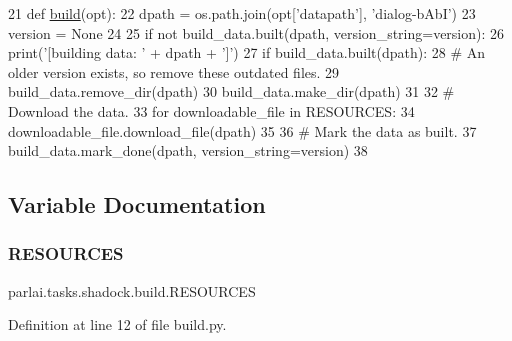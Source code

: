 \begin{DoxyCode}
21 \textcolor{keyword}{def }\hyperlink{namespacedialog__babi__feedback_1_1build_a7a9d289f7493a5ded13c4b7f071b6184}{build}(opt):
22     dpath = os.path.join(opt[\textcolor{stringliteral}{'datapath'}], \textcolor{stringliteral}{'dialog-bAbI'})
23     version = \textcolor{keywordtype}{None}
24 
25     \textcolor{keywordflow}{if} \textcolor{keywordflow}{not} build\_data.built(dpath, version\_string=version):
26         print(\textcolor{stringliteral}{'[building data: '} + dpath + \textcolor{stringliteral}{']'})
27         \textcolor{keywordflow}{if} build\_data.built(dpath):
28             \textcolor{comment}{# An older version exists, so remove these outdated files.}
29             build\_data.remove\_dir(dpath)
30         build\_data.make\_dir(dpath)
31 
32         \textcolor{comment}{# Download the data.}
33         \textcolor{keywordflow}{for} downloadable\_file \textcolor{keywordflow}{in} RESOURCES:
34             downloadable\_file.download\_file(dpath)
35 
36         \textcolor{comment}{# Mark the data as built.}
37         build\_data.mark\_done(dpath, version\_string=version)
38 \end{DoxyCode}


\subsection{Variable Documentation}
\mbox{\label{namespaceparlai_1_1tasks_1_1shadock_1_1build_a5af01f72748dbdcccd71aab32f5cbcbe}} 
\subsubsection{\texorpdfstring{R\+E\+S\+O\+U\+R\+C\+ES}{RESOURCES}}
{\footnotesize\ttfamily parlai.\+tasks.\+shadock.\+build.\+R\+E\+S\+O\+U\+R\+C\+ES}



Definition at line 12 of file build.\+py.

